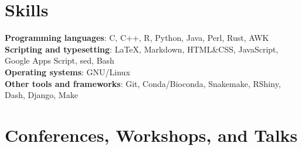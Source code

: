 \documentclass[letterpaper,10.5pt]{article}
\begin{document}
\section{Skills}
\textbf{Programming languages}: C, C++, R, Python, Java, Perl, Rust, AWK \\
\textbf{Scripting and typesetting}: \LaTeX, Markdown, HTML\&CSS, JavaScript, Google Apps Script, sed, Bash \\
\textbf{Operating systems}: GNU/Linux \\
\textbf{Other tools and frameworks}: Git,  Conda/Bioconda, Snakemake, RShiny, Dash, Django, Make \\





\section{Conferences, Workshops, and Talks}
\end{document}
